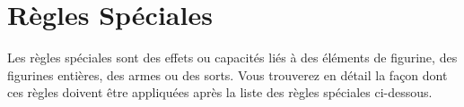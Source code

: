 
\part{Règles Spéciales}
\label{special_rules}

Les règles spéciales sont des effets ou capacités liés à des éléments de figurine, des figurines entières, des armes ou des sorts. Vous trouverez en détail la façon dont ces règles doivent être appliquées après la liste des règles spéciales ci-dessous.

\vspace*{20pt}
\hypertarget{specialrulestable}{%
\begin{framed}
\vspace*{-10pt}
\setlength\columnseprule{0.5pt}
\begin{multicols}{3}\raggedcolumns
\noindent\hyperlink{requirestwohands}{\requirestwohands}\newline
\hyperlink{randomattacks}{\randomattacks{}}\newline
\hyperlink{grindingattacks}{\grindingattacks{}}\newline
\hyperlink{divineattacks}{\divineattacks}\newline
\hyperlink{crushattack}{\crushattack}\newline
\hyperlink{poisonedattacks}{\poisonedattacks}\newline
\hyperlink{flamingattacks}{\flamingattacks}\newline
\hyperlink{lightningattacks}{\lightningattacks}\newline
\hyperlink{magicalattacks}{\magicalattacks}\newline
\hyperlink{sweepingattack}{\sweepingattack}\newline
\hyperlink{penetrating}{\penetrating}\newline
\hyperlink{breathweapon}{\breathweapon{}}\newline
\hyperlink{toxicattacks}{\toxicattacks}\newline
\hyperlink{areaattack}{\areaattack{}}\newline
\hyperlink{vanguard}{\vanguard}\newline
\hyperlink{multiplewounds}{\multiplewounds{}{}}\newline
\hyperlink{channel}{\channel}\newline
\hyperlink{scoring}{\scoring}\newline
\hyperlink{fastcavalry}{\fastcavalry}\newline
\hyperlink{devastatingcharge}{\devastatingcharge}\newline

\end{multicols}
\end{framed}}
